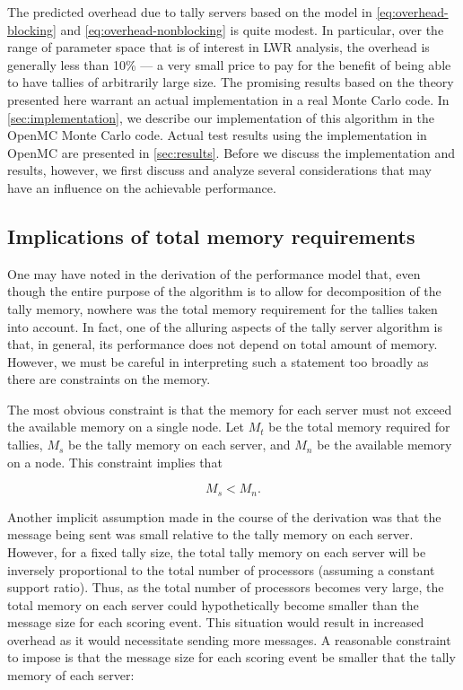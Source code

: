 The predicted overhead due to tally servers based on the model in
\eqref{eq:overhead-blocking} and \eqref{eq:overhead-nonblocking} is quite
modest. In particular, over the range of parameter space that is of interest in
LWR analysis, the overhead is generally less than 10\% --- a very small price to
pay for the benefit of being able to have tallies of arbitrarily large size. The
promising results based on the theory presented here warrant an actual
implementation in a real Monte Carlo code. In \autoref{sec:implementation}, we
describe our implementation of this algorithm in the OpenMC Monte Carlo
code. Actual test results using the implementation in OpenMC are presented in
\autoref{sec:results}. Before we discuss the implementation and results,
however, we first discuss and analyze several considerations that may have an
influence on the achievable performance.

\subsection{Implications of total memory requirements}

One may have noted in the derivation of the performance model that, even though
the entire purpose of the algorithm is to allow for decomposition of the tally
memory, nowhere was the total memory requirement for the tallies taken into
account. In fact, one of the alluring aspects of the tally server algorithm is
that, in general, its performance does not depend on total amount of
memory. However, we must be careful in interpreting such a statement too broadly
as there are constraints on the memory.

The most obvious constraint is that the memory for each server must not exceed
the available memory on a single node. Let $M_t$ be the total memory required for
tallies, $M_s$ be the tally memory on each server, and $M_n$ be the available
memory on a node. This constraint implies that

\begin{equation}
  \label{eq:constraint-total}
  M_s < M_n.
\end{equation}

Another implicit assumption made in the course of the derivation was that the
message being sent was small relative to the tally memory on each
server. However, for a fixed tally size, the total tally memory on each server
will be inversely proportional to the total number of processors (assuming a
constant support ratio). Thus, as the total number of processors becomes very
large, the total memory on each server could hypothetically become smaller than
the message size for each scoring event. This situation would result in
increased overhead as it would necessitate sending more messages. A reasonable
constraint to impose is that the message size for each scoring event be smaller
that the tally memory of each server:

